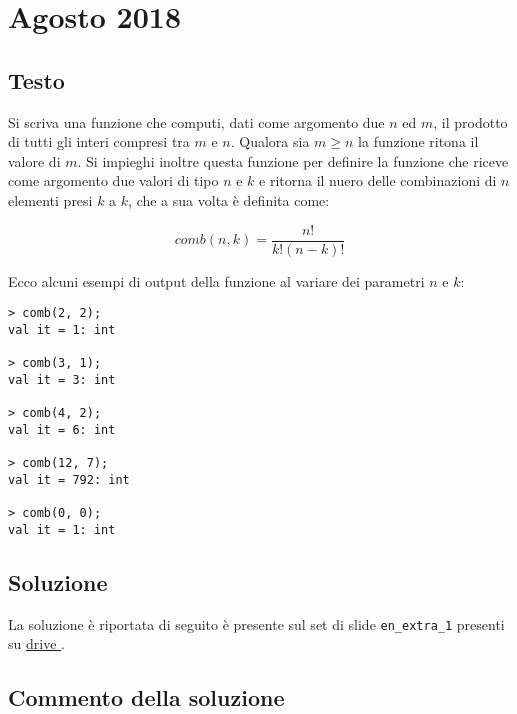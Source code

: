 \section{Agosto 2018}

\subsection*{Testo}

Si scriva una funzione  che computi, dati come argomento due  \(n\) ed \(m\), il prodotto di tutti gli interi compresi tra \(m\) e \(n\). %
Qualora sia \(m \geqslant n\) la funzione ritona il valore di \(m\). %
Si impieghi inoltre questa funzione per definire la funzione  che riceve come argomento due valori di tipo  \(n\) e \(k\) e ritorna il nuero delle combinazioni di \(n\) elementi presi \(k\) a \(k\), che a sua volta è definita come:

\begin{equation*}
comb(n, k) = \frac{n!}{k! (n - k)!}
\end{equation*}

Ecco alcuni esempi di output della funzione al variare dei parametri \(n\) e \(k\):

\begin{lstlisting}[style = SML, frame = none]
> comb(2, 2);
val it = 1: int

> comb(3, 1);
val it = 3: int

> comb(4, 2);
val it = 6: int

> comb(12, 7);
val it = 792: int

> comb(0, 0);
val it = 1: int
\end{lstlisting}

\subsection*{Soluzione}

La soluzione è riportata di seguito è presente sul set di slide \texttt{en\_extra\_1} presenti su %
\href{https://drive.google.com/drive/u/1/folders/1mRM8Vjdcvwe5yU9ZYCYf0p2Fylxr5qBL}{drive \ExternalLink}.



\subsection{Commento della soluzione}

